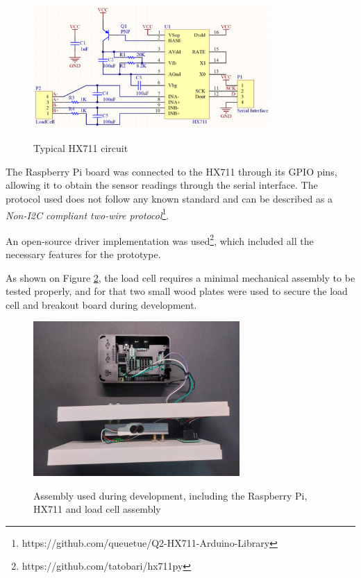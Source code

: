 \begin{figure}[H]
	\centering
	\caption[Typical HX711 circuit]{Typical HX711 circuit}
    \includegraphics[width=0.8\textwidth]{./images/hx711circuit.png}
    \label{fig:hx711circuit}
\end{figure}

The Raspberry Pi board was connected to the HX711 through its GPIO pins,
allowing it to obtain the sensor readings through the serial interface. The
protocol used does not follow any known standard and can be
described as a \textit{Non-I2C compliant two-wire
protocol}\footnote{https://github.com/queuetue/Q2-HX711-Arduino-Library}.

An open-source driver implementation was used\footnote{https://github.com/tatobari/hx711py}, 
which included all the necessary features for the prototype.

As shown on Figure \ref{fig:devassembly}, the load cell requires a minimal
mechanical assembly to be tested properly, and for that two small wood plates
were used to secure the load cell and breakout board during development.

\begin{figure}[H]
	\centering
    \caption[Assembly used during development, including the Raspberry Pi, HX711 and load cell assembly]{Assembly used during development, including the Raspberry Pi, HX711 and load cell assembly}
    \includegraphics[width=0.7\textwidth]{./images/raspberrypiwithloadcell.jpeg}
	\fonte{}
	\label{fig:devassembly}
\end{figure}

